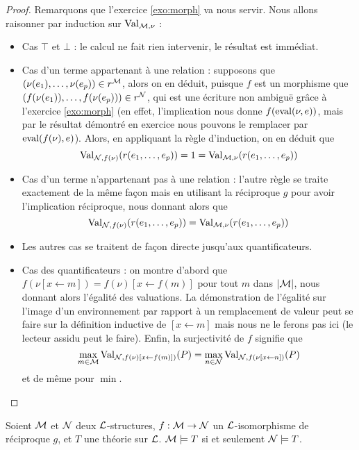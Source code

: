 \begin{proof}
    Remarquons que l'exercice \ref{exo:morph} va nous servir. Nous allons raisonner par induction sur $\mathrm{Val}_{\mathcal M,\nu}$ :
    \begin{itemize}[label=$\bullet$]
        \item Cas $\top$ et $\bot$ : le calcul ne fait rien intervenir, le résultat est immédiat.
        \item Cas d'un terme appartenant à une relation : supposons que $(\nu(e_1),\ldots,\nu(e_p))\in r^\mathcal M$, alors on en déduit, puisque $f$ est un morphisme que $(f(\nu(e_1)),\ldots,f(\nu(e_p)))\in r^\mathcal N$, qui est une écriture non ambiguë grâce à l'exercice \ref{exo:morph} (en effet, l'implication nous donne $f(\mathrm{eval}(\nu,e))$, mais par le résultat démontré en exercice nous pouvons le remplacer par $\mathrm{eval}(f(\nu),e)$). Alors, en appliquant la règle d'induction, on en déduit que $$\mathrm{Val}_{\mathcal N,f(\nu)}(r(e_1,\ldots,e_p)) = 1 = \mathrm{Val}_{\mathcal M,\nu}(r(e_1,\ldots,e_p))$$
        \item Cas d'un terme n'appartenant pas à une relation : l'autre règle se traite exactement de la même façon mais en utilisant la réciproque $g$ pour avoir l'implication réciproque, nous donnant alors que $$\mathrm{Val}_{\mathcal N,f(\nu)}(r(e_1,\ldots,e_p)) = \mathrm{Val}_{\mathcal M,\nu}(r(e_1,\ldots,e_p))$$
        \item Les autres cas se traitent de façon directe jusqu'aux quantificateurs.
        \item Cas des quantificateurs : on montre d'abord que $f(\nu[x\leftarrow m]) = f(\nu)[x\leftarrow f(m)]$ pour tout $m$ dans $|\mathcal M|$, nous donnant alors l'égalité des valuations. La démonstration de l'égalité sur l'image d'un environnement par rapport à un remplacement de valeur peut se faire sur la définition inductive de $[x\leftarrow m]$ mais nous ne le ferons pas ici (le lecteur assidu peut le faire). Enfin, la surjectivité de $f$ signifie que $$\max_{m\in\mathcal M} \mathrm{Val}_{\mathcal N,f(\nu)[x\leftarrow f(m)])}(P) = \max_{n\in\mathcal N} \mathrm{Val}_{\mathcal N,f(\nu[x\leftarrow n])}(P)$$ et de même pour $\min$.
    \end{itemize}
\end{proof}

\begin{them}
    Soient $\mathcal M$ et $\mathcal N$ deux $\mathcal L$-structures, $f : \mathcal M\to\mathcal N$ un $\mathcal L$-isomorphisme de réciproque $g$, et $T$ une théorie sur $\mathcal L$. $\mathcal M\models T$ si et seulement $\mathcal N\models T$.
\end{them}


